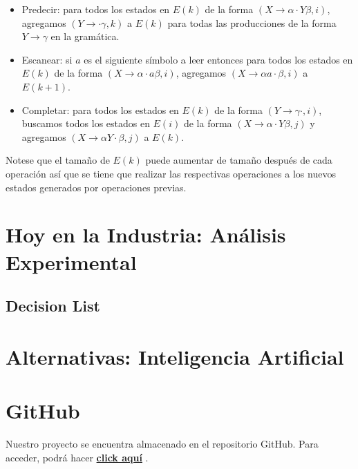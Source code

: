 \documentclass[12pt]{article}
\begin{document}
\begin{itemize}
    \item Predecir: para todos los estados en $E(k)$ de la forma $(X \rightarrow \alpha \cdot Y \beta,i)$, agregamos $(Y \rightarrow \cdot \gamma , k)$ a $E(k)$ para todas las producciones de la forma $Y \rightarrow \gamma$ en la gramática.
    \item Escanear: si $a$ es el siguiente símbolo a leer entonces para todos los estados en $E(k)$ de la forma $(X \rightarrow \alpha \cdot a \beta,i)$, agregamos $(X \rightarrow \alpha a \cdot \beta,i)$ a $E(k+1)$.
    \item Completar:  para todos los estados en $E(k)$ de la forma $(Y \rightarrow \gamma \cdot, i)$, buscamos todos los estados en $E(i)$ de la forma $(X \rightarrow \alpha \cdot Y \beta,j)$ y agregamos $(X \rightarrow \alpha Y \cdot \beta,j)$ a $E(k)$.
\end{itemize}

Notese que el tamaño de $E(k)$ puede aumentar de tamaño después de cada operación así que se tiene que realizar las respectivas operaciones a los nuevos estados generados por operaciones previas.


%



\section{Hoy en la Industria: Análisis Experimental}
 
 \subsection{Decision List}
 

\section{Alternativas: Inteligencia Artificial}
 

\section{GitHub}
Nuestro proyecto se encuentra almacenado en el repositorio GitHub. Para acceder, podrá hacer 
    \textbf{
        \href{https://github.com/christianledgard/Natural-Language-Processing-with-Context-Free-Grammar/}{click aquí} 
    }
.

\newpage

  

\end{document}

